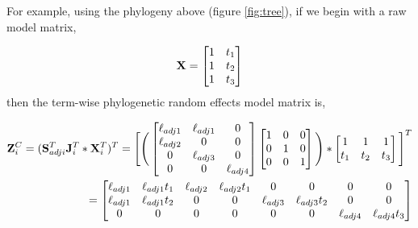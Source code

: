 \documentclass[12pt]{article}
\begin{document}
For example, using the phylogeny above (figure \ref{fig:tree}), if we begin with a raw model matrix,

\begin{align}
{\mathbf X} = \begin{bmatrix}
1 & t_1  \\ 
1 & t_2  \\ 
1 & t_3 
\end{bmatrix} 
\end{align}
then the term-wise phylogenetic random effects model matrix is,

\begin{align}
{\mathbf Z}^{C}_{i} = ({\mathbf S}^{T}_{adji}{\mathbf J}^{T}_{i} \ast {\mathbf X}^{T}_{i})^{T} =
\Bigg[
\Bigg(
\begin{bmatrix}
\ell_{adj1} & \ell_{adj1}  & 0 \\
\ell_{adj2} &  0  & 0 \\
0  &  \ell_{adj3} & 0 \\
0 & 0 &  \ell_{adj4} 
\end{bmatrix}
\begin{bmatrix}
1 & 0  & 0 \\
0 & 1  & 0 \\
0 & 0  & 1  
\end{bmatrix}
\Bigg)
\ast
\begin{bmatrix}
1   & 1   & 1  \\ 
t_1 & t_2 & t_3
\end{bmatrix} 
\Bigg]^T
\\
= \begin{bmatrix}
\ell_{adj1} & \ell_{adj1}t_1 & \ell_{adj2} & \ell_{adj2}t_1 & 0 & 0 & 0 & 0 \\
\ell_{adj1} & \ell_{adj1}t_2 & 0 & 0 & \ell_{adj3} & \ell_{adj3}t_2 & 0 & 0 \\
0 & 0 & 0 & 0 & 0 & 0 & \ell_{adj4} & \ell_{adj4}t_3
\end{bmatrix}
\end{align}


% 
% 
\end{document}
